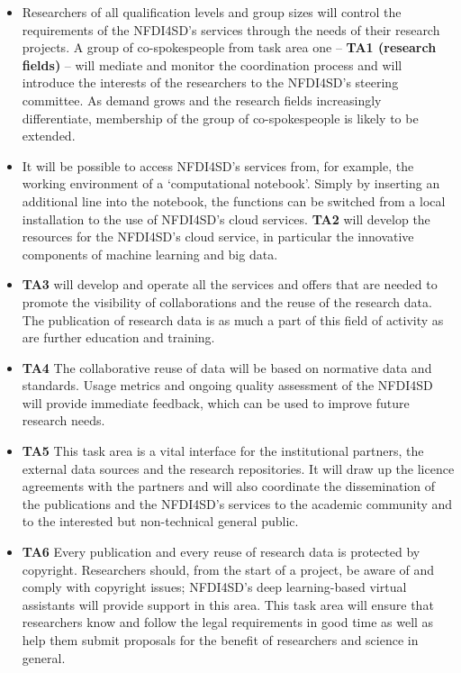\documentclass[
  english,
  paper=a4,
  oneside,captions=tableheading
]{scrbook}
\begin{document}
\begin{itemize}
\item
  Researchers of all qualification levels and group sizes will control
  the requirements of the NFDI4SD's services through the needs of their
  research projects. A group of co-spokespeople from task area one --
  \textbf{TA1 (research fields)} -- will mediate and monitor the
  coordination process and will introduce the interests of the
  researchers to the NFDI4SD's steering committee. As demand grows and
  the research fields increasingly differentiate, membership of the
  group of co-spokespeople is likely to be extended.
\item
  It will be possible to access NFDI4SD's services from, for example,
  the working environment of a `computational notebook'. Simply by
  inserting an additional line into the notebook, the functions can be
  switched from a local installation to the use of NFDI4SD's cloud
  services. \textbf{TA2} will develop the resources for the NFDI4SD's
  cloud service, in particular the innovative components of machine
  learning and big data.
\item
  \textbf{TA3} will develop and operate all the services and offers that
  are needed to promote the visibility of collaborations and the reuse
  of the research data. The publication of research data is as much a
  part of this field of activity as are further education and training.
\item
  \textbf{TA4} The collaborative reuse of data will be based on
  normative data and standards. Usage metrics and ongoing quality
  assessment of the NFDI4SD will provide immediate feedback, which can
  be used to improve future research needs.
\item
  \textbf{TA5} This task area is a vital interface for the institutional
  partners, the external data sources and the research repositories. It
  will draw up the licence agreements with the partners and will also
  coordinate the dissemination of the publications and the NFDI4SD's
  services to the academic community and to the interested but
  non-technical general public.
\item
  \textbf{TA6} Every publication and every reuse of research data is
  protected by copyright. Researchers should, from the start of a
  project, be aware of and comply with copyright issues; NFDI4SD's deep
  learning-based virtual assistants will provide support in this area.
  This task area will ensure that researchers know and follow the legal
  requirements in good time as well as help them submit proposals for
  the benefit of researchers and science in general.
\end{itemize}
\end{document}
